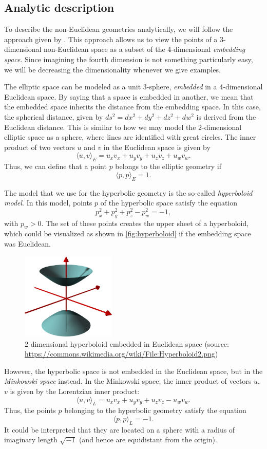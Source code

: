 \subsection{Analytic description}
To describe the non-Euclidean geometries analytically, we will follow the approach given by \cite{Szirmay-Kalos2022}.
This approach allows us to view the points of a 3-dimensional non-Euclidean space as a subset of the 4-dimensional \textit{embedding space}.
Since imagining the fourth dimension is not something particularly easy, we will be decreasing the dimensionality whenever we give examples.

The elliptic space can be modeled as a unit 3-sphere, \textit{embedded} in a 4-dimensional Euclidean space.
By saying that a space is embedded in another, we mean that the embedded space inherits the distance from the embedding space.
In this case, the spherical distance, given by $ds^2 = dx^2 + dy^2 + dz^2 + dw^2$ is derived from the Euclidean distance.
This is similar to how we may model the 2-dimensional elliptic space as a sphere, where lines are identified with great circles.
The inner product of two vectors $u$ and $v$ in the Euclidean space is given by
$$ \langle u, v \rangle_E  = u_xv_x + u_yv_y + u_zv_z + u_wv_w.$$
Thus, we can define that a point $p$ belongs to the elliptic geometry if
$$ \langle p, p \rangle_E = 1.$$

The model that we use for the hyperbolic geometry is the so-called \textit{hyperboloid model}.
In this model, points $p$ of the hyperbolic space satisfy the equation
$$p_x^2 + p_y^2 + p_z^2 - p_w^2 = -1,$$
with $p_w > 0$.
The set of these points creates the upper sheet of a hyperboloid, which could be visualized as shown in \autoref{fig:hyperboloid} if the embedding space was Euclidean.
\begin{figure}[!htb]
    \centering
    \includegraphics[width=0.4\textwidth]{chapters/theoretical_foundations/sections/non-eudlidean-spaces/resources/hyperboloid.png}
    \caption{2-dimensional hyperboloid embedded in Euclidean space (source: \url{https://commons.wikimedia.org/wiki/File:Hyperboloid2.png})}
    \label{fig:hyperboloid}
\end{figure}
However, the hyperbolic space is not embedded in the Euclidean space, but in the \textit{Minkowski space} instead.
In the Minkowski space, the inner product of vectors $u$, $v$ is given by the Lorentzian inner product:
$$\langle u, v \rangle_L = u_xv_x + u_yv_y + u_zv_z - u_wv_w.$$
Thus, the points $p$ belonging to the hyperbolic geometry satisfy the equation
$$\langle p, p \rangle_L = -1.$$
It could be interpreted that they are located on a sphere with a radius of imaginary length $\sqrt{-1}$ (and hence are equidistant from the origin).

